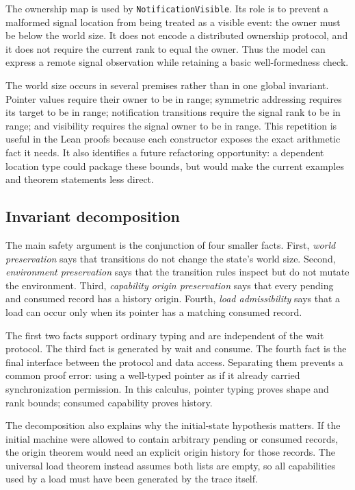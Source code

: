 \documentclass[a4paper,USenglish]{lipics-v2021}
\begin{document}
The ownership map is used by \texttt{NotificationVisible}. Its role is to
prevent a malformed signal location from being treated as a visible event: the
owner must be below the world size. It does not encode a distributed ownership
protocol, and it does not require the current rank to equal the owner. Thus the
model can express a remote signal observation while retaining a basic
well-formedness check.

The world size occurs in several premises rather than in one global invariant.
Pointer values require their owner to be in range; symmetric addressing
requires its target to be in range; notification transitions require the
signal rank to be in range; and visibility requires the signal owner to be in
range. This repetition is useful in the Lean proofs because each constructor
exposes the exact arithmetic fact it needs. It also identifies a future
refactoring opportunity: a dependent location type could package these bounds,
but would make the current examples and theorem statements less direct.

\subsection{Invariant decomposition}
The main safety argument is the conjunction of four smaller facts. First,
\emph{world preservation} says that transitions do not change the state's
world size. Second, \emph{environment preservation} says that the transition
rules inspect but do not mutate the environment. Third, \emph{capability
origin preservation} says that every pending and consumed record has a history
origin. Fourth, \emph{load admissibility} says that a load can occur only when
its pointer has a matching consumed record.

The first two facts support ordinary typing and are independent of the wait
protocol. The third fact is generated by wait and consume. The fourth fact is
the final interface between the protocol and data access. Separating them
prevents a common proof error: using a well-typed pointer as if it already
carried synchronization permission. In this calculus, pointer typing proves
shape and rank bounds; consumed capability proves history.

The decomposition also explains why the initial-state hypothesis matters. If
the initial machine were allowed to contain arbitrary pending or consumed
records, the origin theorem would need an explicit origin history for those
records. The universal load theorem instead assumes both lists are empty, so
all capabilities used by a load must have been generated by the trace itself.
\end{document}
